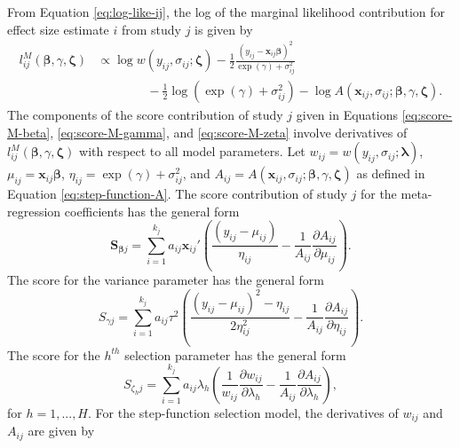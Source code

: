 \documentclass[
  american,
  man, donotrepeattitle,floatsintext]{apa7}
\begin{document}
From Equation \eqref{eq:log-like-ij}, the log of the marginal likelihood contribution for effect size estimate \(i\) from study \(j\) is given by
\begin{align}
l^M_{ij}\left(\boldsymbol\beta, \gamma, \boldsymbol\zeta \right) &\propto \log w\left(y_{ij}, \sigma_{ij}; \boldsymbol\zeta \right) - \frac{1}{2} \frac{\left(y_{ij} - \mathbf{x}_{ij} \boldsymbol\beta\right)^2}{\exp(\gamma) + \sigma_{ij}^2} \nonumber \\
& \qquad \qquad  - \frac{1}{2}\log\left(\exp(\gamma) + \sigma_{ij}^2\right) - \log A\left(\mathbf{x}_{ij}, \sigma_{ij}; \boldsymbol\beta, \gamma, \boldsymbol\zeta \right).
\end{align}
The components of the score contribution of study \(j\) given in Equations \eqref{eq:score-M-beta}, \eqref{eq:score-M-gamma}, and \eqref{eq:score-M-zeta} involve derivatives of \(l^M_{ij}\left(\boldsymbol\beta, \gamma, \boldsymbol\zeta \right)\) with respect to all model parameters.
Let \(w_{ij} = w\left(y_{ij}, \sigma_{ij}; \boldsymbol\lambda \right)\), \(\mu_{ij} = \mathbf{x}_{ij} \boldsymbol\beta\), \(\eta_{ij} = \exp(\gamma) + \sigma_{ij}^2\), and \(A_{ij} = A\left(\mathbf{x}_{ij}, \sigma_{ij}; \boldsymbol\beta, \gamma, \boldsymbol\zeta \right)\) as defined in Equation \eqref{eq:step-function-A}.
The score contribution of study \(j\) for the meta-regression coefficients has the general form
\begin{equation}
\mathbf{S}_{\boldsymbol\beta j} = \sum_{i=1}^{k_j}  a_{ij} \mathbf{x}_{ij}' \left(\frac{\left(y_{ij} - \mu_{ij} \right)}{\eta_{ij}} - \frac{1}{A_{ij}}\frac{\partial A_{ij}}{\partial  \mu_{ij}}\right).
\end{equation}
The score for the variance parameter has the general form
\begin{equation}
S_{\gamma j} = \sum_{i=1}^{k_j} a_{ij} \tau^2 \left(\frac{\left(y_{ij} - \mu_{ij}\right)^2 - \eta_{ij}}{2\eta_{ij}^2} - \frac{1}{A_{ij}}\frac{\partial A_{ij}}{\partial \eta_{ij}}\right).
\end{equation}
The score for the \(h^{th}\) selection parameter has the general form
\begin{equation}
S_{\zeta_h j} = \sum_{i=1}^{k_j} a_{ij} \lambda_h \left(\frac{1}{w_{ij}}\frac{\partial w_{ij}}{\partial \lambda_{h}} - \frac{1}{A_{ij}}\frac{\partial A_{ij}}{\partial \lambda_{h}}\right),
\end{equation}
for \(h = 1,...,H\).
For the step-function selection model, the derivatives of \(w_{ij}\) and \(A_{ij}\) are given by
\end{document}
